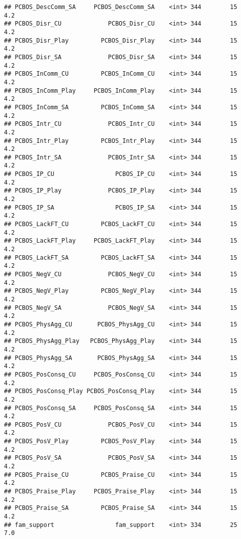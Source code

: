 \documentclass[
]{article}
\begin{document}
\begin{verbatim}
## PCBOS_DescComm_SA     PCBOS_DescComm_SA    <int> 344        15             4.2
## PCBOS_Disr_CU             PCBOS_Disr_CU    <int> 344        15             4.2
## PCBOS_Disr_Play         PCBOS_Disr_Play    <int> 344        15             4.2
## PCBOS_Disr_SA             PCBOS_Disr_SA    <int> 344        15             4.2
## PCBOS_InComm_CU         PCBOS_InComm_CU    <int> 344        15             4.2
## PCBOS_InComm_Play     PCBOS_InComm_Play    <int> 344        15             4.2
## PCBOS_InComm_SA         PCBOS_InComm_SA    <int> 344        15             4.2
## PCBOS_Intr_CU             PCBOS_Intr_CU    <int> 344        15             4.2
## PCBOS_Intr_Play         PCBOS_Intr_Play    <int> 344        15             4.2
## PCBOS_Intr_SA             PCBOS_Intr_SA    <int> 344        15             4.2
## PCBOS_IP_CU                 PCBOS_IP_CU    <int> 344        15             4.2
## PCBOS_IP_Play             PCBOS_IP_Play    <int> 344        15             4.2
## PCBOS_IP_SA                 PCBOS_IP_SA    <int> 344        15             4.2
## PCBOS_LackFT_CU         PCBOS_LackFT_CU    <int> 344        15             4.2
## PCBOS_LackFT_Play     PCBOS_LackFT_Play    <int> 344        15             4.2
## PCBOS_LackFT_SA         PCBOS_LackFT_SA    <int> 344        15             4.2
## PCBOS_NegV_CU             PCBOS_NegV_CU    <int> 344        15             4.2
## PCBOS_NegV_Play         PCBOS_NegV_Play    <int> 344        15             4.2
## PCBOS_NegV_SA             PCBOS_NegV_SA    <int> 344        15             4.2
## PCBOS_PhysAgg_CU       PCBOS_PhysAgg_CU    <int> 344        15             4.2
## PCBOS_PhysAgg_Play   PCBOS_PhysAgg_Play    <int> 344        15             4.2
## PCBOS_PhysAgg_SA       PCBOS_PhysAgg_SA    <int> 344        15             4.2
## PCBOS_PosConsq_CU     PCBOS_PosConsq_CU    <int> 344        15             4.2
## PCBOS_PosConsq_Play PCBOS_PosConsq_Play    <int> 344        15             4.2
## PCBOS_PosConsq_SA     PCBOS_PosConsq_SA    <int> 344        15             4.2
## PCBOS_PosV_CU             PCBOS_PosV_CU    <int> 344        15             4.2
## PCBOS_PosV_Play         PCBOS_PosV_Play    <int> 344        15             4.2
## PCBOS_PosV_SA             PCBOS_PosV_SA    <int> 344        15             4.2
## PCBOS_Praise_CU         PCBOS_Praise_CU    <int> 344        15             4.2
## PCBOS_Praise_Play     PCBOS_Praise_Play    <int> 344        15             4.2
## PCBOS_Praise_SA         PCBOS_Praise_SA    <int> 344        15             4.2
## fam_support                 fam_support    <int> 334        25             7.0

\end{verbatim}
\end{document}
